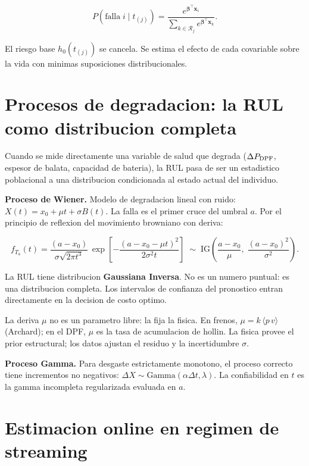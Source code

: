 \documentclass[11pt,a4paper]{article}
\begin{document}
$$P(\text{falla}\;i \mid t_{(j)}) =
  \frac{e^{\boldsymbol{\beta}^\top\mathbf{x}_i}}
       {\sum_{k \in \mathcal{R}_j} e^{\boldsymbol{\beta}^\top\mathbf{x}_k}}.$$

El riesgo base $h_0(t_{(j)})$ se cancela. Se estima el efecto de cada
covariable sobre la vida con minimas suposiciones distribucionales.

\section{Procesos de degradacion: la RUL como distribucion completa}

Cuando se mide directamente una variable de salud que degrada
($\Delta P_{\rm DPF}$, espesor de balata, capacidad de bateria), la RUL
pasa de ser un estadistico poblacional a una distribucion condicionada al
estado actual del individuo.

\textbf{Proceso de Wiener.} Modelo de degradacion lineal con ruido:
$X(t) = x_0 + \mu t + \sigma B(t)$.
La falla es el primer cruce del umbral $a$. Por el principio de reflexion
del movimiento browniano con deriva:

$$f_{T_a}(t) = \frac{(a-x_0)}{\sigma\sqrt{2\pi t^3}}\,
  \exp\!\left[-\frac{(a-x_0-\mu t)^2}{2\sigma^2 t}\right]
  \;\sim\;
  \mathrm{IG}\!\left(\frac{a-x_0}{\mu},\;\frac{(a-x_0)^2}{\sigma^2}\right).$$

La RUL tiene distribucion \textbf{Gaussiana Inversa}. No es un numero
puntual: es una distribucion completa. Los intervalos de confianza del
pronostico entran directamente en la decision de costo optimo.

La deriva $\mu$ no es un parametro libre: la fija la fisica. En frenos,
$\mu = k\,\langle p\,v \rangle$ (Archard); en el DPF, $\mu$ es la tasa
de acumulacion de hollin. La fisica provee el prior estructural; los datos
ajustan el residuo y la incertidumbre $\sigma$.

\textbf{Proceso Gamma.} Para desgaste estrictamente monotono, el proceso
correcto tiene incrementos no negativos: $\Delta X \sim \mathrm{Gamma}(\alpha\Delta t,\lambda)$.
La confiabilidad en $t$ es la gamma incompleta regularizada evaluada en $a$.

\section{Estimacion online en regimen de streaming}
\end{document}
